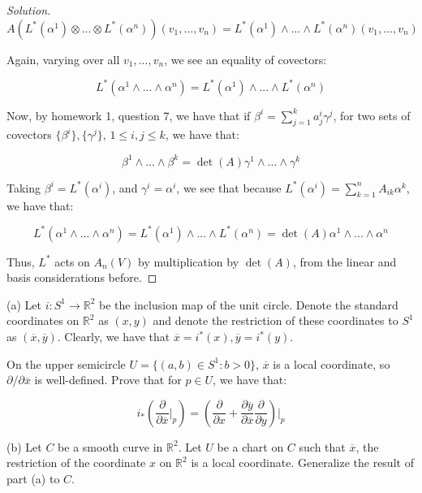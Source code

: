 \documentclass[10pt]{article}
\theoremstyle{nonumberplain}%
\newenvironment{problem}[2][]{\begin{trivlist}
\item[\hskip \labelsep {\bfseries #1}\hskip \labelsep {\bfseries #2.}]}{\end{trivlist}}
\begin{document}
\begin{proof}[Solution]
$$  A(L^*(\alpha^1) \otimes ... \otimes L^*(\alpha^n))(v_1,...,v_n) = L^*(\alpha^1) \wedge ... \wedge L^*(\alpha^n)(v_1,...,v_n) $$

Again, varying over all $v_1,...,v_n$, we see an equality of covectors:

$$  L^*(\alpha^1 \wedge ... \wedge \alpha^n) =  L^*(\alpha^1) \wedge ... \wedge L^*(\alpha^n) $$

Now, by homework 1, question 7, we have that if $ \beta^i  = \sum_{j=1}^k a_j^i \gamma^j$, for two sets of covectors $\{\beta^i\},\{ \gamma^j\}$, $1 \leq i,j \leq k$, we have that:

$$ \beta^1 \wedge ... \wedge \beta^k = \det(A) \gamma^1 \wedge ... \wedge \gamma^k$$

Taking $\beta^i = L^*(\alpha^i)$, and $\gamma^i = \alpha^i$, we see that because $ L^*(\alpha^i) = \sum_{k=1}^n A_{ik}\alpha^k$, we have that:

$$  L^*(\alpha^1 \wedge ... \wedge \alpha^n) =  L^*(\alpha^1) \wedge ... \wedge L^*(\alpha^n) = \det(A) \alpha^1 \wedge ... \wedge \alpha^n $$

Thus, $L^*$ acts on $A_n(V)$ by multiplication by $\det(A)$, from the linear and basis considerations before.

\end{proof}

\begin{problem}{Question 3}

(a) Let $i: S^1 \to \mathbb{R}^2$ be the inclusion map of the unit circle. Denote the standard coordinates on $\mathbb{R}^2$ as $(x,y)$ and denote the restriction of these coordinates to $S^1$ as $(\overline{x}, \overline{y})$. Clearly, we have that $\overline{x} = i^*(x), \overline{y} = i^*(y)$. 

On the upper semicircle $U = \{ (a,b) \in S^1 : b > 0 \}$, $\overline{x}$ is a local coordinate, so $\partial/\partial \overline{x}$ is well-defined. Prove that for $p\in U$, we have that:

$$i_* \left( \frac{\partial}{\partial \overline{x}} \bigg|_p \right) = \left( \frac{\partial}{\partial x} + \frac{\partial \overline{y}}{\partial \overline{x}} \frac{\partial}{\partial y} \right)\bigg|_p$$

(b) Let $C$ be a smooth curve in $\mathbb{R}^2$. Let $U$ be a chart on $C$ such that $\overline{x}$, the restriction of the coordinate $x$ on $\mathbb{R}^2$ is a local coordinate. Generalize the result of part (a) to $C$.

\end{problem}
\end{document}
